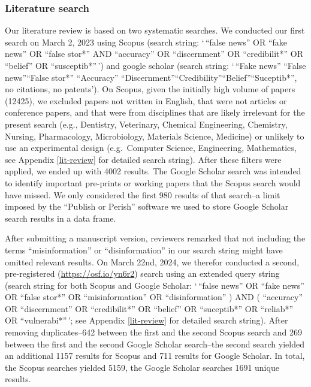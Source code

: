 \documentclass[
  man]{apa6}
\begin{document}
\subsubsection{Literature search}\label{literature-search}

Our literature review is based on two systematic searches. We conducted our first search on March 2, 2023 using Scopus (search string: `\,``false news'' OR ``fake news'' OR ``false stor*'' AND ``accuracy'' OR ``discernment'' OR ``credibilit*'' OR ``belief'' OR ``susceptib*''\,') and google scholar (search string: `\,``Fake news'' \textbar{} ``False news''\textbar{}``False stor*'' ``Accuracy'' \textbar{} ``Discernment''\textbar{}``Credibility''\textbar{}``Belief''\textbar{}``Suceptib*'', no citations, no patents'). On Scopus, given the initially high volume of papers (12425), we excluded papers not written in English, that were not articles or conference papers, and that were from disciplines that are likely irrelevant for the present search (e.g., Dentistry, Veterinary, Chemical Engineering, Chemistry, Nursing, Pharmacology, Microbiology, Materials Science, Medicine) or unlikely to use an experimental design (e.g.~Computer Science, Engineering, Mathematics, see Appendix \ref{lit-review} for detailed search string). After these filters were applied, we ended up with 4002 results. The Google Scholar search was intended to identify important pre-prints or working papers that the Scopus search would have missed. We only considered the first 980 results of that search--a limit imposed by the ``Publish or Perish'' software we used to store Google Scholar search results in a data frame.

After submitting a manuscript version, reviewers remarked that not including the terms ``misinformation'' or ``disinformation'' in our search string might have omitted relevant results. On March 22nd, 2024, we therefor conducted a second, pre-registered (\url{https://osf.io/yn6r2}) search using an extended query string (search string for both Scopus and Google Scholar: `\,``false news'' OR ``fake news'' OR ``false stor*'' OR ``misinformation'' OR ``disinformation'' ) AND ( ``accuracy'' OR ``discernment'' OR ``credibilit*'' OR ``belief'' OR ``suceptib*'' OR ``reliab*'' OR ``vulnerabi*''\,'; see Appendix \ref{lit-review} for detailed search string). After removing duplicates--642 between the first and the second Scopus search and 269 between the first and the second Google Scholar search--the second search yielded an additional 1157 results for Scopus and 711 results for Google Scholar. In total, the Scopus searches yielded 5159, the Google Scholar searches 1691 unique results.
\end{document}
